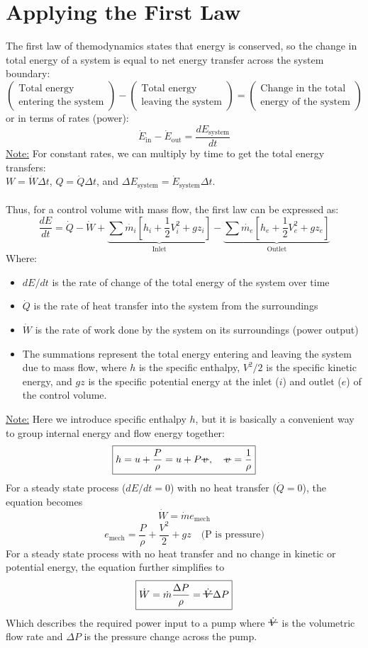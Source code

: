 \documentclass[12pt]{article}
\newcommand{\vol}{\mathord{\text{\ooalign{\hidewidth $V$\hidewidth\cr\kern-0.5pt\raisebox{0.8ex}{\rule[0pt]{1em}{0.5pt}}}}}}
\newcommand{\svol}{%
  \mathord{\ooalign{%
    \hfil$v$\hfil\cr
    \hfil\rule[0.6ex]{0.8em}{0.5pt}\hfil
  }}%
}
\begin{document}
\section*{Applying the First Law}
The first law of themodynamics states that energy is conserved, so the change in total energy of a system is equal to net energy transfer across the system boundary:
$$ \left( \begin{gathered} \text{Total energy} \\ \text{entering the system} \end{gathered} \right) - \left( \begin{gathered} \text{Total energy} \\ \text{leaving the system} \end{gathered} \right) = \left( \begin{gathered} \text{Change in the total} \\ \text{energy of the system} \end{gathered} \right) $$
or in terms of rates (power):
\[\dot{E}_{\text{in}} - \dot{E}_{\text{out}} = \frac{dE_{\text{system}}}{dt}\]
\underline{Note:} For constant rates, we can multiply by time to get the total energy transfers: \\$W = \dot{W} \Delta t$, $Q = \dot{Q} \Delta t$, and $\Delta E_{\text{system}} = \dot{E}_{\text{system}} \Delta t$.\\\\
Thus, for a control volume with mass flow, the first law can be expressed as:
\[\boxed{\frac{dE}{dt} = \dot{Q}-\dot{W}+
\underbrace{\sum \dot{m_i}\left[h_i+\frac{1}{2}V_i^2+g z_i\right]}_{\text{Inlet}}
-\underbrace{\sum \dot{m_e}\left[h_e+\frac{1}{2}V_e^2+g z_e\right]}_{\text{Outlet}}}\]
Where:
\begin{itemize}
\item $dE/dt$ is the rate of change of the total energy of the system over time
\item $\dot{Q}$ is the rate of heat transfer into the system from the surroundings
\item $\dot{W}$ is the rate of work done by the system on its surroundings (power output)
\item The summations represent the total energy entering and leaving the system due to mass flow, where $h$ is the specific enthalpy, $V^2/2$ is the specific kinetic energy, and $gz$ is the specific potential energy at the inlet ($i$) and outlet ($e$) of the control volume.
\end{itemize}
\underline{Note:} Here we introduce specific enthalpy $h$, but it is basically a convenient way to group internal energy and flow energy together:
\[\boxed{h = u + \frac{P}{\rho} = u + P\svol, \quad \svol = \frac{1}{\rho}}\]
For a steady state process ($dE/dt = 0$) with no heat transfer ($\dot{Q}=0$), the equation becomes
\[\boxed{\dot{W} = \dot{m} e_{\text{mech}}}\]
\[e_{\text{mech}} = \frac{P}{\rho} +\frac{V^2}{2}+gz \quad \text{(P is pressure)}\]
For a steady state process with no heat transfer and no change in kinetic or potential energy, the equation further simplifies to
\[\boxed{\dot{W} = \dot{m}\frac{\Delta P}{\rho}=\dot{\vol} \Delta P}\]
Which describes the required power input to a pump where $\dot{\vol}$ is the volumetric flow rate and $\Delta P$ is the pressure change across the pump.
\end{document}
